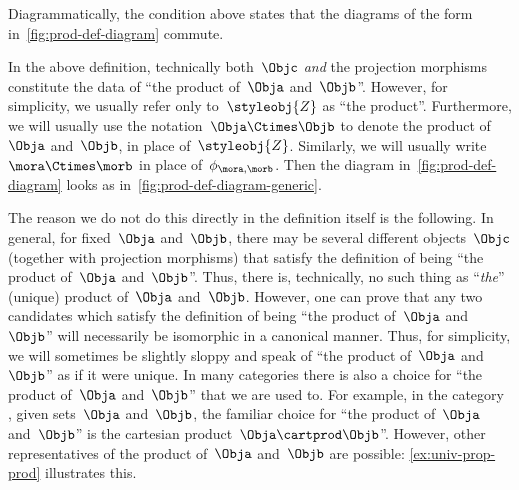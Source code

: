 \begin{remark}
	\label{re:prod-comm-diag}
	Diagrammatically, the condition above states that the diagrams of the form in~\cref{fig:prod-def-diagram} commute.
\end{remark}

\begin{marginfigure}
	\centering
	\caption{}
	\label{fig:prod-def-diagram-generic}
\end{marginfigure}

\begin{remark}
	\label{prod unique up to iso}
	In the above definition, technically both~$\Objc$ \emph{and} the projection morphisms constitute the data of ``the product of~$\Obja$ and~$\Objb$''.
	However, for simplicity, we usually refer only to~$\styleobj{Z}$ as ``the product''.
	Furthermore, we will usually use the notation~$\Obja \Ctimes \Objb$ to denote the product of~$\Obja$ and~$\Objb$, in place of~$\styleobj{Z}$.
	Similarly, we will usually write~$\mora \Ctimes \morb$ in place of~$\phi_{\mora, \morb}$.
	Then the diagram in~\cref{fig:prod-def-diagram} looks as in~\cref{fig:prod-def-diagram-generic}.

	The reason we do not do this directly in the definition itself is the following.
	In general, for fixed~$\Obja$ and~$\Objb$, there may be several different objects~$\Objc$ (together with projection morphisms) that satisfy the definition of being ``the product of~$\Obja$ and~$\Objb$''.
	Thus, there is, technically, no such thing as ``\emph{the}'' (unique) product of~$\Obja$ and~$\Objb$.
	However, one can prove that any two candidates which satisfy the definition of being ``the product of~$\Obja$ and~$\Objb$'' will necessarily be isomorphic in a canonical manner.
	Thus, for simplicity, we will sometimes be slightly sloppy and speak of ``the product of~$\Obja$ and~$\Objb$'' as if it were unique.
	In many categories there is also a choice for ``the product of~$\Obja$ and~$\Objb$'' that we are used to.
	For example, in the category \Set, given sets~$\Obja$ and~$\Objb$, the familiar choice for ``the product of~$\Obja$ and~$\Objb$'' is the cartesian product~$\Obja \cartprod \Objb$''.
	However, other representatives of the product of~$\Obja$ and~$\Objb$ are possible: \cref{ex:univ-prop-prod} illustrates this.
\end{remark}

